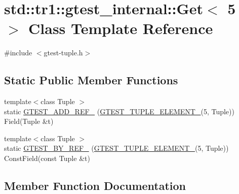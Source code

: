 \hypertarget{classstd_1_1tr1_1_1gtest__internal_1_1_get_3_015_01_4}{}\section{std\+:\+:tr1\+:\+:gtest\+\_\+internal\+:\+:Get$<$ 5 $>$ Class Template Reference}
\label{classstd_1_1tr1_1_1gtest__internal_1_1_get_3_015_01_4}


{\ttfamily \#include $<$gtest-\/tuple.\+h$>$}

\subsection*{Static Public Member Functions}
\begin{DoxyCompactItemize}
\item 
{\footnotesize template$<$class Tuple $>$ }\\static \hyperlink{classstd_1_1tr1_1_1gtest__internal_1_1_get_3_015_01_4_a0a337088bab3f824f67d1607229fdcc2}{G\+T\+E\+S\+T\+\_\+\+A\+D\+D\+\_\+\+R\+E\+F\+\_\+} (\hyperlink{gtest-tuple_8h_a1b7f133d8aa02e0b7afed7b66781eeb7}{G\+T\+E\+S\+T\+\_\+\+T\+U\+P\+L\+E\+\_\+\+E\+L\+E\+M\+E\+N\+T\+\_\+}(5, Tuple)) Field(Tuple \&t)
\item 
{\footnotesize template$<$class Tuple $>$ }\\static \hyperlink{classstd_1_1tr1_1_1gtest__internal_1_1_get_3_015_01_4_ae10fe16450db82d69b9a4d0b149ca75d}{G\+T\+E\+S\+T\+\_\+\+B\+Y\+\_\+\+R\+E\+F\+\_\+} (\hyperlink{gtest-tuple_8h_a1b7f133d8aa02e0b7afed7b66781eeb7}{G\+T\+E\+S\+T\+\_\+\+T\+U\+P\+L\+E\+\_\+\+E\+L\+E\+M\+E\+N\+T\+\_\+}(5, Tuple)) Const\+Field(const Tuple \&t)
\end{DoxyCompactItemize}


\subsection{Member Function Documentation}
\hypertarget{classstd_1_1tr1_1_1gtest__internal_1_1_get_3_015_01_4_a0a337088bab3f824f67d1607229fdcc2}{}
